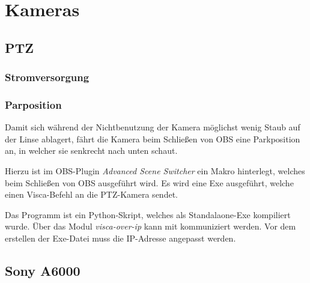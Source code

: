 \chapter{Kameras}
	\section{PTZ}
		\subsection{Stromversorgung}

		\subsection{Parposition}
			Damit sich während der Nichtbenutzung der Kamera möglichst wenig Staub auf der Linse ablagert, fährt die Kamera beim Schließen von OBS eine Parkposition an, in welcher sie senkrecht nach unten schaut.

			Hierzu ist im \Gls{OBS}-Plugin \textit{Advanced Scene Switcher} ein Makro hinterlegt, welches beim Schließen von OBS ausgeführt wird.
			Es wird eine Exe ausgeführt, welche einen \Gls{Visca}-Befehl an die \Gls{PTZ-Kamera} sendet.

			Das Programm ist ein Python-Skript, welches als Standalaone-Exe kompiliert wurde.
			Über das Modul \textit{visca-over-ip} kann mit  kommuniziert werden.
			Vor dem erstellen der Exe-Datei muss die IP-Adresse angepasst werden.
	\section{Sony A6000}